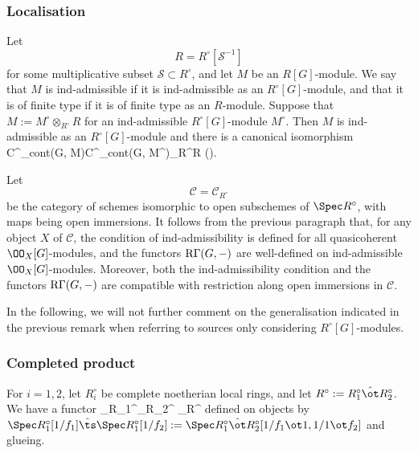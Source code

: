 \subsubsection{Localisation} Let
$$R=R^{\circ}[\mathcal{S}^{-1}]$$
 for some multiplicative subset $\mathcal{S}\subset R^{\circ}$, and let $M$ be an $R[G]$-module. We say that $M$ is ind-admissible if it is ind-admissible as an $R^{\circ}[G]$-module, and that it is of finite type if it is of finite type as an $R$-module. Suppose that   $M:=M^{\circ}\otimes_{R^{\circ}} R$ for an ind-admissible $R^{\circ}[G]$-module $M^{\circ}$. Then $M$ is ind-admissible  as an $R^{\circ}[G]$-module and   there is a canonical isomorphism
\beq\label{localisation}
C^{\bullet}_{\rm cont}(G, M)\cong C^{\bullet}_{\rm cont}(G, M^{\circ})\otimes_{R^{\circ}}R
\eeq
(\cite[(3.7.4)]{nek-selmer}).


\begin{rema}
\notready {}Let
$$\mathscr{C}= \mathscr{C}_{R^{\circ}}$$
be the category of schemes isomorphic to open subschemes of $\Spec R^{\circ}$, with maps being open immersions. It follows  from  the previous paragraph that,  for any object $X$ of $\mathscr{C}$,  the condition of ind-admissibility is defined for all quasicoherent $\OO_{X}[G]$-modules, and  the functors ${\rm R}\Gamma(G,- )$  are well-defined on ind-admissible  $\OO_{X}[G]$-modules. Moreover, both the ind-admissibility condition and the functors ${\rm R}\Gamma(G, - )$  are compatible with restriction along open immersions in $\mathscr{C}$.
\end{rema}

In  the  following, we will not further comment on the generalisation indicated in the previous remark when referring to sources only considering $R^{\circ}[G]$-modules.

\subsubsection{Completed product}  For $i=1,2$, let $R_{i}^{\circ}$ be complete noetherian local rings, and let $R^{\circ}:= R_{1}^{\circ}\hat{\ot} R_{2}^{\circ}$. We have  a functor
\beq{}\hat{\ts}\colon {}_{R_{1}^{\circ}}\ts {}_{R_{2}^{\circ}} \to  {}_{R^{\circ} }\eeq
defined on objects
by $\Spec R_{1}^{\circ}[1/f_{1}] \hat{\ts} \Spec R_{1}^{\circ}[1/f_{2}]:= \Spec R_{1}^{\circ}\hat{\ot}R_{2}^{\circ}[1/f_{1}\ot1, 1/1\ot f_{2}]$ and glueing.

